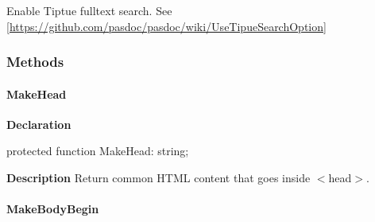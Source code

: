 \documentclass{report}
\newif\ifpdf
\begin{document}
\begin{list}{}
\begin{flushleft}
\ifpdf
\end{flushleft}
\fi


\par Enable Tiptue fulltext search. See [\href{https://github.com/pasdoc/pasdoc/wiki/UseTipueSearchOption}{https://github.com/pasdoc/pasdoc/wiki/UseTipueSearchOption}]\end{list}
\subsubsection*{\large{\textbf{Methods}}\normalsize\hspace{1ex}\hfill}
\paragraph*{MakeHead}\hspace*{\fill}

\label{PasDoc_GenHtml.TGenericHTMLDocGenerator-MakeHead}
\begin{list}{}{
\setlength{\itemindent}{0cm}
\setlength{\listparindent}{0cm}
\setlength{\leftmargin}{\evensidemargin}
\addtolength{\leftmargin}{\tmplength}
\settowidth{\labelsep}{X}
\addtolength{\leftmargin}{\labelsep}
\setlength{\labelwidth}{\tmplength}
}
\item[\textbf{Declaration}\hfill]
\ifpdf
\begin{flushleft}
\fi
\begin{ttfamily}
protected function MakeHead: string;\end{ttfamily}

\ifpdf
\end{flushleft}
\fi

\par
\item[\textbf{Description}]
Return common HTML content that goes inside {$<$}head{$>$}.

\end{list}
\paragraph*{MakeBodyBegin}\hspace*{\fill}
\end{document}
